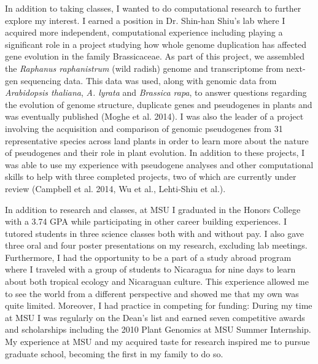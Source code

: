 \documentclass[12pt]{amsart}
\begin{document}
In addition to taking classes, I wanted to do computational research to further explore my interest.  
I earned a position in Dr. Shin-han Shiu's lab where I acquired more independent,  computational experience including playing a significant role in a project studying how whole genome duplication has affected gene evolution in the family Brassicaceae.  
As part of this project, we assembled the \textit{Raphanus raphanistrum} (wild radish) genome and transcriptome from next-gen sequencing data.  
This data was used, along with genomic data from \textit{Arabidopsis thaliana}, \textit{A. lyrata} and \textit{Brassica rapa}, to answer questions regarding the evolution of genome structure, duplicate genes and pseudogenes in plants and was eventually published (Moghe et al. 2014). 
I was also the leader of a project involving the acquisition and comparison of genomic pseudogenes from 31 representative species across land plants in order to learn more about the nature of pseudogenes and their role in plant evolution.  
In addition to these projects, I was able to use my experience with pseudogene analyses and other computational skills to help with three completed projects, two of which are currently under review (Campbell et al. 2014, Wu et al., Lehti-Shiu et al.).

In addition to research and classes, at MSU I graduated in the Honors College with a 3.74 GPA while participating in other career building experiences.  
I tutored students in three science classes both with and without pay.
I also gave three oral and four poster presentations on my research, excluding lab meetings.
Furthermore, I had the opportunity to be a part of a study abroad program where I traveled with a group of students to Nicaragua for nine days to learn about both tropical ecology and Nicaraguan culture. 
This experience allowed me to see the world from a different perspective and showed me that my own was quite limited.
Moreover, I had practice in competing for funding:
During my time at MSU I was regularly on the Dean's list and earned seven competitive awards and scholarships including the 2010 Plant Genomics at MSU Summer Internship. 
My experience at MSU and my acquired taste for research inspired me to pursue graduate school, becoming the first in my family to do so.
\end{document}

